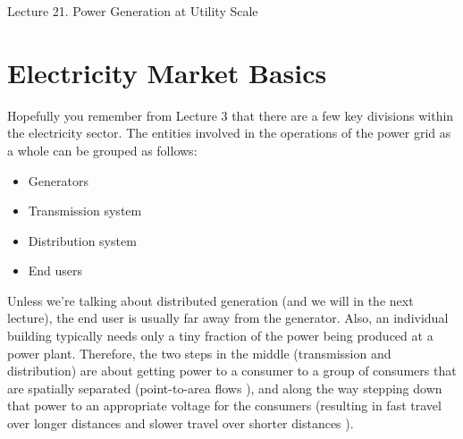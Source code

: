 \documentclass[10pt]{article}
\begin{document}
   \noindent
   \begin{center}

   \hrulefill
   
   \vspace{5pt}
   
   \vspace{0pt}
   
   {\Large \hfill  Lecture 21.  
Power Generation at Utility Scale}
   \vspace{5pt}
   
  
   \hrulefill
   \end{center}

{}

\section{Electricity Market Basics}

Hopefully you remember from Lecture 3 that there are a few key divisions within the electricity sector. The entities involved in the operations of the power grid as a whole can be grouped as follows:

\vspace{-6pt}
\begin{itemize}
    \setlength{\itemsep}{0pt}%
    \setlength{\parskip}{0pt}%
    \item Generators
    \item Transmission system
    \item Distribution system
    \item End users
\end{itemize}
\vspace{-6pt}

Unless we're talking about distributed generation (and we will in the next lecture), the end user is usually far away from the generator. Also, an individual building typically needs only a tiny fraction of the power being produced at a power plant. Therefore, the two steps in the middle (transmission and distribution) are about getting power to a consumer to a group of consumers that are spatially separated (point-to-area flows \cite{Bejan2017-ff}), and along the way stepping down that power to an appropriate voltage for the consumers (resulting in fast travel over longer distances and slower travel over shorter distances \cite{Bejan2017-ff}). 
\end{document}
